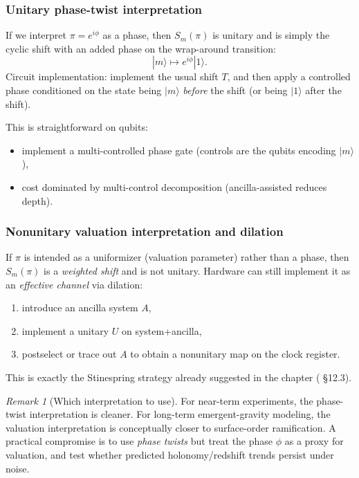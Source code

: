\documentclass[11pt,oneside]{amsbook}
\numberwithin{equation}{section}
\theoremstyle{plain}
\theoremstyle{definition}
\theoremstyle{remark}
\newtheorem{remark}[theorem]{Remark}
\begin{document}
\subsubsection{Unitary phase-twist interpretation}
If we interpret $\pi=e^{i\phi}$ as a phase, then $S_m(\pi)$ is unitary and is simply the cyclic shift with an added phase on the wrap-around transition:
\[
|m\rangle \mapsto e^{i\phi}|1\rangle.
\]
Circuit implementation: implement the usual shift $T$, and then apply a controlled phase conditioned on the state being $|m\rangle$ \emph{before} the shift (or being $|1\rangle$ after the shift).

This is straightforward on qubits:
\begin{itemize}
\item implement a multi-controlled phase gate (controls are the qubits encoding $|m\rangle$),
\item cost dominated by multi-control decomposition (ancilla-assisted reduces depth).
\end{itemize}

\subsubsection{Nonunitary valuation interpretation and dilation}
If $\pi$ is intended as a uniformizer (valuation parameter) rather than a phase, then $S_m(\pi)$ is a \emph{weighted shift} and is not unitary.
Hardware can still implement it as an \emph{effective channel} via dilation:
\begin{enumerate}
\item introduce an ancilla system $A$,
\item implement a unitary $U$ on system+ancilla,
\item postselect or trace out $A$ to obtain a nonunitary map on the clock register.
\end{enumerate}
This is exactly the Stinespring strategy already suggested in the  chapter ( \S12.3).

\begin{remark}[Which interpretation to use]
For near-term experiments, the phase-twist interpretation is cleaner.
For long-term emergent-gravity modeling, the valuation interpretation is conceptually closer to surface-order ramification.
A practical compromise is to use \emph{phase twists} but treat the phase $\phi$ as a proxy for valuation, and test whether predicted holonomy/redshift trends persist under noise.
\end{remark}
\end{document}
